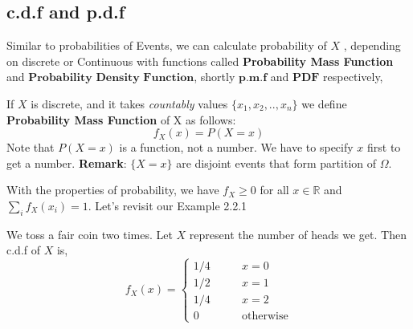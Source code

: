 \subsection*{c.d.f and p.d.f}
Similar to probabilities of Events, we can calculate probability of $X$ , depending on discrete or Continuous with functions called
\textbf{ Probability Mass Function} and $\textbf{Probability Density Function}$, shortly $\textbf{p.m.f}$ and $\textbf{PDF}$ respectively,

\begin{definition}
    If $X$ is discrete, and it takes \textit{countably} values $ \{ x_1,x_2,..,
    x_n \}$ we define \textbf{Probability Mass Function} of X as follows:
    $$f_X(x)= P(X = x)$$
    Note that $P(X = x)$ is a function, not a number. We have to specify $x$ first to get a number.
    \textbf{Remark}: $ \{ X=x \} $ are disjoint events that form partition of $\Omega$.
\end{definition}

With the properties of probability, we have $f_X \ge 0$ for all $x \in \mathbb{R}$ and $\sum_{i} f_X (x_i) =1 $. Let's revisit our Example 2.2.1

\begin{example}
    We toss a fair coin two times. Let $X$ represent the number of heads we get. Then c.d.f of $X$ is,
    \[f_X(x) =
        \begin{cases}
            1/4 \qquad &x=0\\
            1/2 \qquad &x=1 \\
            1/4 \qquad &x=2\\
            0 \qquad &\text{otherwise}
        \end{cases}
    \]
\end{example}

